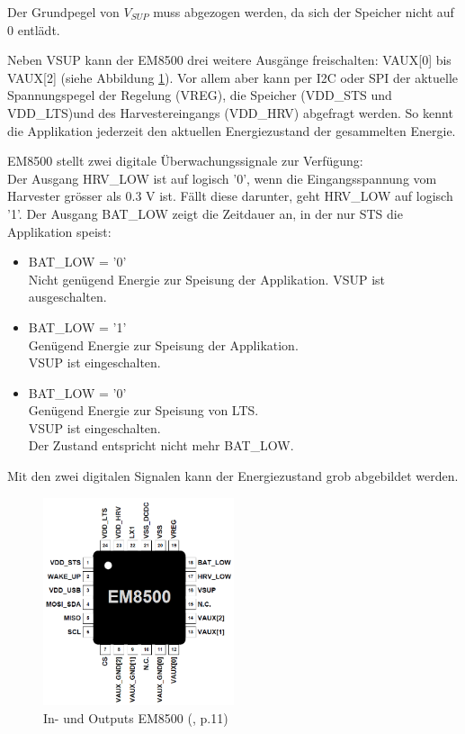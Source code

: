 Der Grundpegel von $V_{SUP}$ muss abgezogen werden, da sich der Speicher nicht auf 0 entlädt.

Neben VSUP kann der EM8500 drei weitere Ausgänge freischalten: VAUX[0] bis VAUX[2] (siehe Abbildung  \ref{IOEM8500}). Vor allem aber kann per I2C oder SPI der aktuelle Spannungspegel der Regelung (VREG), die Speicher (VDD\_STS und VDD\_LTS)und des Harvestereingangs (VDD\_HRV) abgefragt werden. So kennt die Applikation jederzeit den aktuellen Energiezustand der gesammelten Energie.

EM8500 stellt zwei digitale Überwachungssignale zur Verfügung:\\ 
Der Ausgang HRV\_LOW ist auf logisch '0', wenn die Eingangsspannung vom Harvester grösser als 0.3 V ist. Fällt diese darunter, geht HRV\_LOW auf logisch '1'.
Der Ausgang BAT\_LOW zeigt die Zeitdauer an, in der nur STS die Applikation speist:

\begin{itemize}
     \item BAT\_LOW = '0'\\
           Nicht genügend Energie zur Speisung der Applikation.
           VSUP ist ausgeschalten.
     \item BAT\_LOW = '1'\\
           Genügend Energie zur Speisung der Applikation.\\
           VSUP ist eingeschalten.
      \item BAT\_LOW = '0'\\
           Genügend Energie zur Speisung von LTS.\\
           VSUP ist eingeschalten.\\
           Der Zustand entspricht nicht mehr BAT\_LOW.   
\end{itemize} 

Mit den zwei digitalen Signalen kann der Energiezustand grob abgebildet werden.

\begin{figure}[ht]
    \includegraphics[width=0.5\textwidth]{2TheoretischeGrundlagen/imag/EM8500IO.png}
    \caption{In- und Outputs EM8500  (\cite{datasheet_EM85}, p.11)}
    \label{IOEM8500} 
\end{figure}



